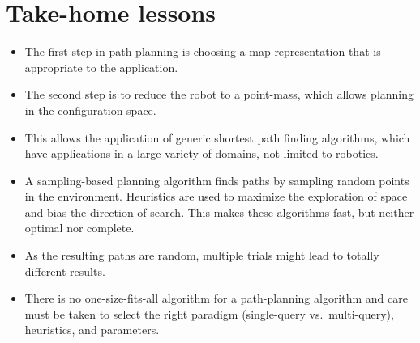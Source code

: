 \section*{Take-home lessons}
\begin{itemize}
\item The first step in path-planning is choosing a map representation that is appropriate to the application.
\item The second step is to reduce the robot to a point-mass, which allows planning in the configuration space.
\item This allows the application of generic shortest path finding algorithms, which have applications in a large variety of domains, not limited to robotics.
\item A sampling-based planning algorithm finds paths by sampling random points in the environment. Heuristics are used to maximize the exploration of space and bias the direction of search. This makes these algorithms fast, but neither optimal nor complete.
\item As the resulting paths are random, multiple trials might lead to totally different results.
\item There is no one-size-fits-all algorithm for a path-planning algorithm and care must be taken to select the right paradigm (single-query vs.\ multi-query), heuristics, and parameters.
\end{itemize}


